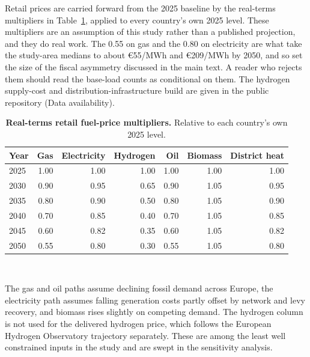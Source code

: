 Retail prices are carried forward from the 2025 baseline by the real-terms multipliers in
Table~\ref{tab:si_pricepath}, applied to every country's own 2025 level. These
multipliers are an assumption of this study rather than a published projection, and they
do real work. The 0.55 on gas and the 0.80 on electricity are what take the study-area
medians to about \euro{}55/MWh and \euro{}209/MWh by 2050, and so set the size of the
fiscal asymmetry discussed in the main text. A reader who rejects them should read the
base-load counts as conditional on them. The hydrogen supply-cost and
distribution-infrastructure build are given in the public repository (Data availability).

\begin{table}[htbp]
 \centering
 \caption{\textbf{Real-terms retail fuel-price multipliers.} Relative to each country's
 own 2025 level.}
 \label{tab:si_pricepath}
 \begin{tabular}{lrrrrrr}
 \toprule
 Year & Gas & Electricity & Hydrogen & Oil & Biomass & District heat \\
 \midrule
 2025 & 1.00 & 1.00 & 1.00 & 1.00 & 1.00 & 1.00 \\
 2030 & 0.90 & 0.95 & 0.65 & 0.90 & 1.05 & 0.95 \\
 2035 & 0.80 & 0.90 & 0.50 & 0.80 & 1.05 & 0.90 \\
 2040 & 0.70 & 0.85 & 0.40 & 0.70 & 1.05 & 0.85 \\
 2045 & 0.60 & 0.82 & 0.35 & 0.60 & 1.05 & 0.82 \\
 2050 & 0.55 & 0.80 & 0.30 & 0.55 & 1.05 & 0.80 \\
 \bottomrule
 \end{tabular}
 \\[3pt]{\footnotesize\raggedright
 The gas and oil paths assume declining fossil demand across Europe, the electricity path
 assumes falling generation costs partly offset by network and levy recovery, and biomass
 rises slightly on competing demand. The hydrogen column is not used for the delivered
 hydrogen price, which follows the European Hydrogen Observatory trajectory separately.
 These are among the least well constrained inputs in the study and are swept in the
 sensitivity analysis.\par}
\end{table}

